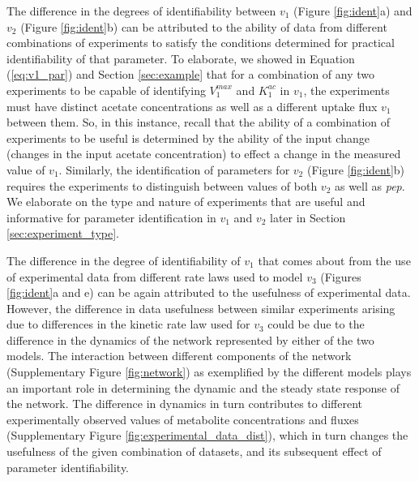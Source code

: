 \documentclass[10pt]{article}
\begin{document}
	The difference in the degrees of identifiability between $v_1$ (Figure \ref{fig:ident}a) and $v_2$ (Figure \ref{fig:ident}b) can be attributed to the ability of data from different combinations of experiments to satisfy the conditions determined for practical identifiability of that parameter. To elaborate, we showed in Equation (\ref{eq:v1_par}) and Section \ref{sec:example} that for a combination of any two experiments to be capable of identifying $V_1^{max}$ and $K_1^{ac}$ in $v_1$, the experiments must have distinct acetate concentrations as well as a different uptake flux $v_1$ between them. So, in this instance, recall that the ability of a combination of experiments to be useful is determined by the ability of the input change (changes in the input acetate concentration) to effect a change in the measured value of $v_1$. Similarly, the identification of parameters for $v_2$ (Figure \ref{fig:ident}b) requires the experiments to distinguish between values of both $v_2$ as well as \textit{pep}. We elaborate on the type and nature of experiments that are useful and informative for parameter identification in $v_1$ and $v_2$ later in Section \ref{sec:experiment_type}.
	
	The difference in the degree of identifiability of $v_1$ that comes about from the use of experimental data from different rate laws used to model $v_3$ (Figures \ref{fig:ident}a and e) can be again attributed to the usefulness of experimental data. However, the difference in data usefulness between similar experiments arising due to differences in the kinetic rate law used for $v_3$ could be due to the difference in the dynamics of the network represented by either of the two models. The interaction between different components of the network (Supplementary Figure \ref{fig:network}) as exemplified by the different models plays an important role in determining the dynamic and the steady state response of the network. The difference in dynamics in turn contributes to different experimentally observed values of metabolite concentrations and fluxes (Supplementary Figure \ref{fig:experimental_data_dist}), which in turn changes the usefulness of the given combination of datasets, and its subsequent effect of parameter identifiability. 
	
\end{document}
